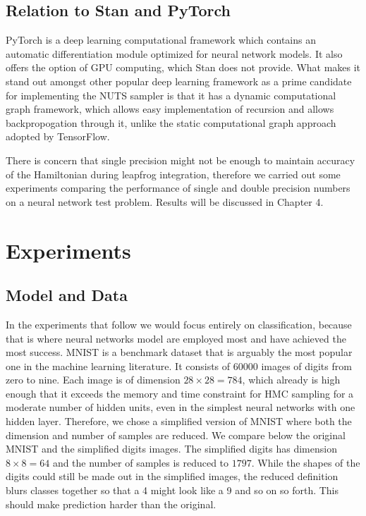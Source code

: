 \documentclass[12pt]{report}
\begin{document}
\section{Relation to Stan and PyTorch}

PyTorch \cite{paszke2017automatic} is a deep learning computational framework which contains an automatic differentiation module optimized for neural network models. It also offers the option of GPU computing, which Stan does not provide. What makes it stand out amongst other popular deep learning framework as a prime candidate for implementing the NUTS sampler is that it has a dynamic computational graph framework, which allows easy implementation of recursion and allows backpropogation through it, unlike the static computational graph approach adopted by TensorFlow.

There is concern that single precision might not be enough to maintain accuracy of the Hamiltonian during leapfrog integration, therefore we carried out some experiments comparing the performance of single and double precision numbers on a neural network test problem. Results will be discussed in Chapter 4.


\chapter{Experiments}
\section{Model and Data}

In the experiments that follow we would focus entirely on classification, because that is where neural networks model are employed most and have achieved the most success. MNIST \cite{lecun-mnisthandwrittendigit-2010} is a benchmark dataset that is arguably the most popular one in the machine learning literature. It consists of 60000 images of digits from zero to nine. Each image is of dimension $ 28 \times 28 = 784 $, which already is high enough that it exceeds the memory and time constraint for HMC sampling for a moderate number of hidden units, even in the simplest neural networks with one hidden layer. Therefore, we chose a simplified version of MNIST where both the dimension and number of samples are reduced. We compare below the original MNIST and the simplified digits images. The simplified digits has dimension $8 \times 8 = 64 $ and the number of samples is reduced to $1797$. While the shapes of the digits could still be made out in the simplified images, the reduced definition blurs classes together so that a 4 might look like a 9 and so on so forth. This should make prediction harder than the original.
\end{document}
